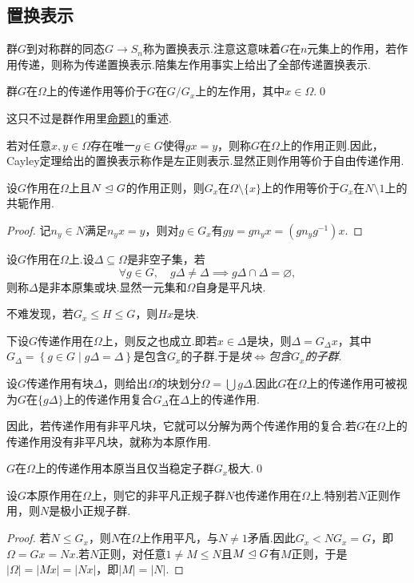 \subsection{置换表示}\label{subsec:PermutationRepresentation}
群$G$到对称群的同态$G\to S_n$称为置换表示.注意这意味着$G$在$n$元集上的作用，若作用传递，则称为{\heiti 传递置换表示}.陪集左作用事实上给出了全部传递置换表示.
\begin{lemma}
	群$G$在$\Omega$上的传递作用等价于$G$在$G/G_x$上的左作用，其中$x\in\Omega$.\qed
\end{lemma}

这只不过是群作用里\hyperlink{prop:GrpActionEquiv}{命题1}的重述.

若对任意$x,y\in\Omega$存在唯一$g\in G$使得$gx=y$，则称$G$在$\Omega$上的作用{\heiti 正则}.因此，Cayley定理给出的置换表示称作是{\heiti 左正则表示}.显然正则作用等价于自由传递作用.

\begin{prop}
	设$G$作用在$\Omega$上且$N\trianglelefteq G$的作用正则，则$G_x$在$\Omega\setminus\{x\}$上的作用等价于$G_x$在$N\setminus 1$上的共轭作用.
\end{prop}
\begin{proof}
	记$n_{y}\in N$满足$n_{y}x=y$，则对$g\in G_x$有$gy=gn_yx=(gn_yg^{-1})x$.
\end{proof}

设$G$作用在$\Omega$上.设$\Delta\subseteq\Omega$是非空子集，若
\[
	\forall g\in G,\quad g\Delta\ne\Delta\implies g\Delta\cap\Delta=\varnothing,
\]
则称$\Delta$是{\heiti 非本原集}或{\heiti 块}.显然一元集和$\Omega$自身是平凡块.

不难发现，若$G_x\le H\le G$，则$Hx$是块.

下设$G$传递作用在$\Omega$上，则反之也成立.即若$x\in\Delta$是块，则$\Delta=G_\Delta x$，其中$G_\Delta=\left\{g\in G\mid g\Delta=\Delta\right\}$是包含$G_x$的子群.于是\emph{块$\Leftrightarrow$包含$G_x$的子群}.

设$G$传递作用有块$\Delta$，则给出$\Omega$的块划分$\Omega=\bigcup g\Delta$.因此$G$在$\Omega$上的传递作用可被视为$G$在$\{g\Delta\}$上的传递作用复合$G_\Delta$在$\Delta$上的传递作用.

因此，若传递作用有非平凡块，它就可以分解为两个传递作用的复合.若$G$在$\Omega$上的传递作用没有非平凡块，就称为{\heiti 本原}作用.

\begin{lemma}
	$G$在$\Omega$上的传递作用本原当且仅当稳定子群$G_x$极大.\qed
\end{lemma}
\begin{prop}
	设$G$本原作用在$\Omega$上，则它的非平凡正规子群$N$也传递作用在$\Omega$上.特别若$N$正则作用，则$N$是极小正规子群.
\end{prop}
\begin{proof}
	若$N\le G_x$，则$N$在$\Omega$上作用平凡，与$N\ne 1$矛盾.因此$G_x<NG_x=G$，即$\Omega=Gx=Nx$.若$N$正则，对任意$1\ne M\le N$且$M\trianglelefteq G$有$M$正则，于是$|\Omega|=|Mx|=|Nx|$，即$|M|=|N|$.
\end{proof}

